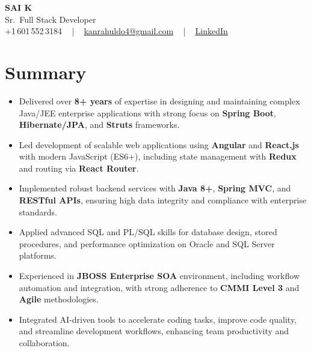 \documentclass[letterpaper,11pt]{article}
\newcommand{\resumeItem}[1]{
  \item\footnotesize{
    {#1 \vspace{-2pt}}
  }
}
\newcommand{\resumeItemListStart}{\begin{itemize}[leftmargin=*]}
\newcommand{\resumeItemListEnd}{\end{itemize}\vspace{-5pt}}
\begin{document}
\begin{center}
    {\fontsize{14pt}{12pt}\selectfont \textbf{\MakeUppercase{Sai K}}}\\ \vspace{2pt}
    \fontsize{10pt}{12pt}\selectfont Sr.\ Full Stack Developer\\ \vspace{2pt}
    \fontsize{10pt}{12pt}\selectfont +1\,601\,552\,3184 ~ | ~
    \href{mailto:kanrahuldo4@gmail.com}{kanrahuldo4@gmail.com} ~ | ~
    \href{https://www.linkedin.com/in/srrrk/}{\color{blue}\underline{LinkedIn}}
    \vspace{-10pt}
\end{center}

\section{Summary}
\fontsize{9pt}{10pt}\selectfont
\resumeItemListStart
  \resumeItem{Delivered over \textbf{8+ years} of expertise in designing and maintaining complex Java/JEE enterprise applications with strong focus on \textbf{Spring Boot}, \textbf{Hibernate/JPA}, and \textbf{Struts} frameworks.}
  \resumeItem{Led development of scalable web applications using \textbf{Angular} and \textbf{React.js} with modern JavaScript (ES6+), including state management with \textbf{Redux} and routing via \textbf{React Router}.}
  \resumeItem{Implemented robust backend services with \textbf{Java 8+}, \textbf{Spring MVC}, and \textbf{RESTful APIs}, ensuring high data integrity and compliance with enterprise standards.}
  \resumeItem{Applied advanced SQL and PL/SQL skills for database design, stored procedures, and performance optimization on Oracle and SQL Server platforms.}
  \resumeItem{Experienced in \textbf{JBOSS Enterprise SOA} environment, including workflow automation and integration, with strong adherence to \textbf{CMMI Level 3} and \textbf{Agile} methodologies.}
  \resumeItem{Integrated AI-driven tools to accelerate coding tasks, improve code quality, and streamline development workflows, enhancing team productivity and collaboration.}
\resumeItemListEnd
\vspace{-6pt}

\end{document}
